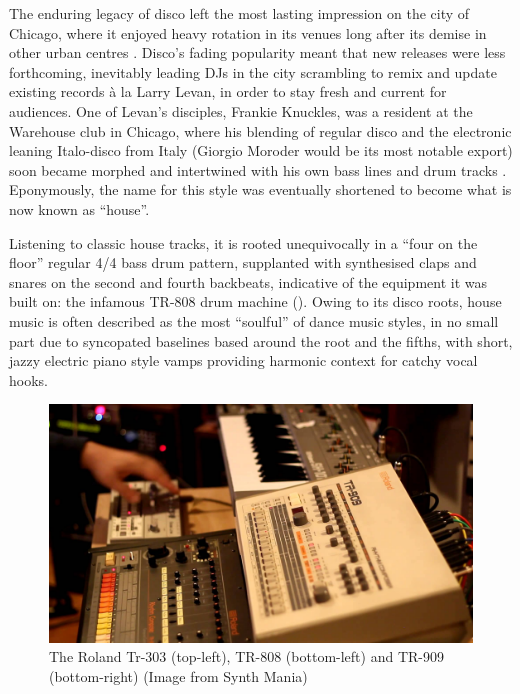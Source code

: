 The enduring legacy of disco left the most lasting impression on the city of Chicago, where it enjoyed heavy rotation in its venues long after its demise in other urban centres \citep{Reynolds2013}. Disco’s fading popularity meant that new releases were less forthcoming, inevitably leading DJs in the city scrambling to remix and update existing records à la Larry Levan, in order to stay fresh and current for audiences. One of Levan’s disciples, Frankie Knuckles, was a resident at the Warehouse club in Chicago, where his blending of regular disco and the electronic leaning Italo-disco from Italy (Giorgio Moroder would be its most notable export) soon became morphed and intertwined with his own bass lines and drum tracks \citep{Butler2006}. Eponymously, the name for this style was eventually shortened to become what is now known as ``house''.

Listening to classic house tracks, it is rooted unequivocally in a ``four on the floor'' regular 4/4 bass drum pattern, supplanted with synthesised claps and snares on the second and fourth backbeats, indicative of the equipment it was built on: the infamous TR-808 drum machine ()\citep{Blashill2002}. Owing to its disco roots, house music is often described as the most “soulful” of dance music styles, in no small part due to syncopated baselines based around the root and the fifths, with short, jazzy electric piano style vamps providing harmonic context for catchy vocal hooks.

\begin{figure}
	\begin{center}
		\includegraphics[width=\figSizeHundred]{ch02_dancemusic/figures/roland.jpg}
	\end{center}
	\caption[Roland Electronic Music Instruments]{The Roland Tr-303 (top-left), TR-808 (bottom-left) and TR-909 (bottom-right) (Image from Synth Mania)}
	\label{fig:roland}
\end{figure}

